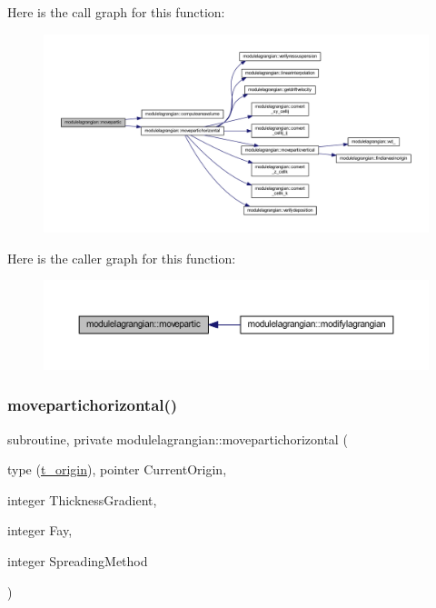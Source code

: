 Here is the call graph for this function\+:\nopagebreak
\begin{figure}[H]
\begin{center}
\leavevmode
\includegraphics[width=350pt]{namespacemodulelagrangian_ad9212277994fb1a55e17c7e17d66aabc_cgraph}
\end{center}
\end{figure}
Here is the caller graph for this function\+:\nopagebreak
\begin{figure}[H]
\begin{center}
\leavevmode
\includegraphics[width=350pt]{namespacemodulelagrangian_ad9212277994fb1a55e17c7e17d66aabc_icgraph}
\end{center}
\end{figure}
\mbox{\label{namespacemodulelagrangian_a9117067712a5138b783af1e0e971235f}} 
\subsubsection{\texorpdfstring{movepartichorizontal()}{movepartichorizontal()}}
{\footnotesize\ttfamily subroutine, private modulelagrangian\+::movepartichorizontal (\begin{DoxyParamCaption}\item[{type (\mbox{\hyperlink{structmodulelagrangian_1_1t__origin}{t\+\_\+origin}}), pointer}]{Current\+Origin,  }\item[{integer}]{Thickness\+Gradient,  }\item[{integer}]{Fay,  }\item[{integer}]{Spreading\+Method }\end{DoxyParamCaption})\hspace{0.3cm}{\ttfamily [private]}}

